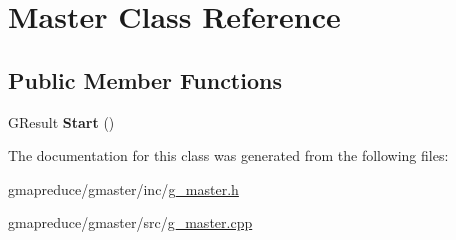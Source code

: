 \hypertarget{class_master}{\section{Master Class Reference}
\label{class_master}
}
\subsection*{Public Member Functions}
\begin{DoxyCompactItemize}
\item 
\hypertarget{class_master_a263eb7b267235d735c48be04711d7978}{G\-Result {\bfseries Start} ()}\label{class_master_a263eb7b267235d735c48be04711d7978}

\end{DoxyCompactItemize}


The documentation for this class was generated from the following files\-:\begin{DoxyCompactItemize}
\item 
gmapreduce/gmaster/inc/\hyperlink{g__master_8h}{g\-\_\-master.\-h}\item 
gmapreduce/gmaster/src/\hyperlink{g__master_8cpp}{g\-\_\-master.\-cpp}\end{DoxyCompactItemize}
